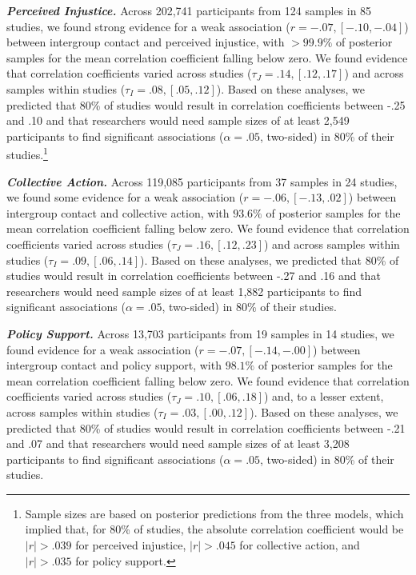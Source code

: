 \documentclass[12pt, letterpaper]{article}
\begin{document}
\textbf{\emph{Perceived Injustice.}} Across 202,741 participants from
124 samples in 85 studies, we found strong evidence for a weak
association (\(r = -.07, [-.10, -.04]\)) between intergroup contact and
perceived injustice, with \(>99.9\%\) of posterior samples for the mean
correlation coefficient falling below zero. We found evidence that
correlation coefficients varied across studies
(\(\tau_J = .14, [.12, .17]\)) and across samples within studies
(\(\tau_I = .08, [.05, .12]\)). Based on these analyses, we predicted
that 80\% of studies would result in correlation coefficients between
-.25 and .10 and that researchers would need sample sizes of at least
2,549 participants to find significant associations (\(\alpha = .05\),
two-sided) in 80\% of their studies.\footnote{Sample sizes are based on
  posterior predictions from the three models, which implied that, for
  80\% of studies, the absolute correlation coefficient would be
  \(|r| > .039\) for perceived injustice, \(|r| > .045\) for collective
  action, and \(|r| > .035\) for policy support.}

\textbf{\emph{Collective Action.}} Across 119,085 participants from 37
samples in 24 studies, we found some evidence for a weak association
(\(r = -.06, [-.13, .02]\)) between intergroup contact and collective
action, with \(93.6\%\) of posterior samples for the mean correlation
coefficient falling below zero. We found evidence that correlation
coefficients varied across studies (\(\tau_J = .16, [.12, .23]\)) and
across samples within studies (\(\tau_I = .09, [.06, .14]\)). Based on
these analyses, we predicted that 80\% of studies would result in
correlation coefficients between -.27 and .16 and that researchers would
need sample sizes of at least 1,882 participants to find significant
associations (\(\alpha = .05\), two-sided) in 80\% of their studies.

\textbf{\emph{Policy Support.}} Across 13,703 participants from 19
samples in 14 studies, we found evidence for a weak association
(\(r = -.07, [-.14, -.00]\)) between intergroup contact and policy
support, with \(98.1\%\) of posterior samples for the mean correlation
coefficient falling below zero. We found evidence that correlation
coefficients varied across studies (\(\tau_J = .10, [.06, .18]\)) and,
to a lesser extent, across samples within studies
(\(\tau_I = .03, [.00, .12]\)). Based on these analyses, we predicted
that 80\% of studies would result in correlation coefficients between
-.21 and .07 and that researchers would need sample sizes of at least
3,208 participants to find significant associations (\(\alpha = .05\),
two-sided) in 80\% of their studies.
\end{document}
